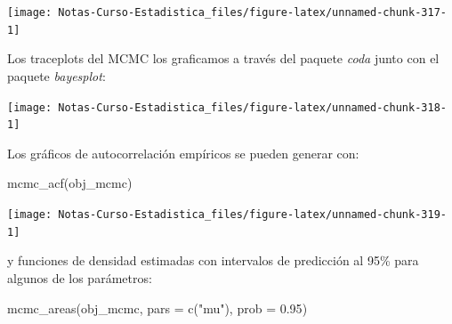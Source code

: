 \documentclass[
  12pt,
]{book}
\newenvironment{Shaded}{\begin{snugshade}}{\end{snugshade}}
\newcommand{\AttributeTok}[1]{\textcolor[rgb]{0.77,0.63,0.00}{#1}}
\newcommand{\DecValTok}[1]{\textcolor[rgb]{0.00,0.00,0.81}{#1}}
\newcommand{\FloatTok}[1]{\textcolor[rgb]{0.00,0.00,0.81}{#1}}
\newcommand{\FunctionTok}[1]{\textcolor[rgb]{0.00,0.00,0.00}{#1}}
\newcommand{\NormalTok}[1]{#1}
\newcommand{\OtherTok}[1]{\textcolor[rgb]{0.56,0.35,0.01}{#1}}
\newcommand{\SpecialCharTok}[1]{\textcolor[rgb]{0.00,0.00,0.00}{#1}}
\newcommand{\StringTok}[1]{\textcolor[rgb]{0.31,0.60,0.02}{#1}}
\begin{document}
\begin{center}\texttt{[image: Notas-Curso-Estadistica\_files/figure-latex/unnamed-chunk-317-1]} \end{center}

Los traceplots del MCMC los graficamos a través del paquete \emph{coda}
junto con el paquete \emph{bayesplot}:

\begin{Shaded}
\end{Shaded}

\begin{center}\texttt{[image: Notas-Curso-Estadistica\_files/figure-latex/unnamed-chunk-318-1]} \end{center}

Los gráficos de autocorrelación empíricos se pueden generar con:

\begin{Shaded}
\begin{Highlighting}[]
\FunctionTok{mcmc\_acf}\NormalTok{(obj\_mcmc)}
\end{Highlighting}
\end{Shaded}

\begin{center}\texttt{[image: Notas-Curso-Estadistica\_files/figure-latex/unnamed-chunk-319-1]} \end{center}

y funciones de densidad estimadas con intervalos de predicción al 95\%
para algunos de los parámetros:

\begin{Shaded}
\begin{Highlighting}[]
\FunctionTok{mcmc\_areas}\NormalTok{(obj\_mcmc, }\AttributeTok{pars =} \FunctionTok{c}\NormalTok{(}\StringTok{"mu"}\NormalTok{), }\AttributeTok{prob =} \FloatTok{0.95}\NormalTok{)}
\end{Highlighting}
\end{Shaded}
\end{document}
